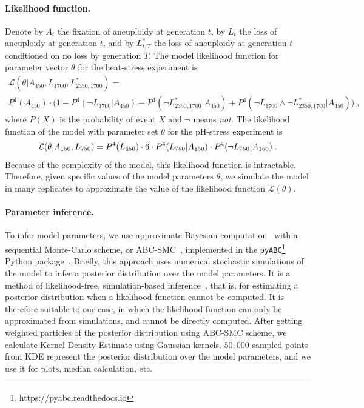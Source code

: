 \documentclass[12pt]{extarticle}
\newcommand{\likelihood}{\mathcal{L}}
\begin{document}
\paragraph{Likelihood function.}
Denote by $A_{t}$ the fixation of aneuploidy at generation $t$, by $L_{t}$ the loss of aneuploidy at generation $t$, and by $L^*_{t,T}$ the loss of aneuploidy at generation $t$ conditioned on no loss by generation $T$.
The model likelihood function for parameter vector $\theta$ for the heat-stress experiment is
\begin{multline} \label{eq:heatstress-likelihood}
\likelihood(\theta | A_{450}, L_{1700}, L^*_{2350, 1700} ) = \\
P^4(A_{450}) \cdot \Big(1 - P^4(\lnot{L_{1700}} | A_{450} ) - P^4(\lnot{L^*_{2350, 1700}}| A_{450}) + P^4(\lnot{L_{1700}} \land \lnot{L^*_{2350, 1700}}| A_{450})\Big)	\;,	
\end{multline}
where $P(X)$ is the probability of event $X$ and $\lnot$ means \emph{not}.
The likelihood function of the model with parameter set $\theta$ for the pH-stress experiment is
\begin{equation} \label{eq:phstress-likelihood}
\likelihood(\theta | A_{150}, L_{750} ) = \\
 P^4(L_{450}) \cdot 6 \cdot	P^4(L_{750} | A_{150}) \cdot P^4(\lnot{L_{750}} | A_{150}) \;.  %
\end{equation} 
Because of the complexity of the model, this likelihood function is intractable. Therefore, given specific values of the model parameters $\theta$, we simulate the model in many replicates to approximate the value of the likelihood function $\likelihood(\theta)$.

\paragraph{Parameter inference.} To infer model parameters, we use approximate Bayesian computation~\citep{Sunnaker2013} with a sequential Monte-Carlo scheme, or ABC-SMC~\citep{Sisson2009}, implemented in the \texttt{pyABC}\footnote{https://pyabc.readthedocs.io} Python 
package~\citep{Klinger2018}.
Briefly, this approach uses numerical stochastic simulations of the model to infer a posterior distribution over the model parameters. It is a method of likelihood-free, simulation-based inference~\citep{Cranmer2020}, that is, for estimating a posterior distribution when a likelihood function cannot be computed. It is therefore suitable to our case, in which the likelihood function can only be approximated from simulations, and cannot be directly computed. 
After getting weighted particles of the posterior distribution using ABC-SMC scheme, we calculate Kernel Density Estimate using Gaussian kernels. $50,000$ sampled points from KDE represent the posterior distribution over the model parameters, and we use it for plots, median calculation, etc.
\end{document}
